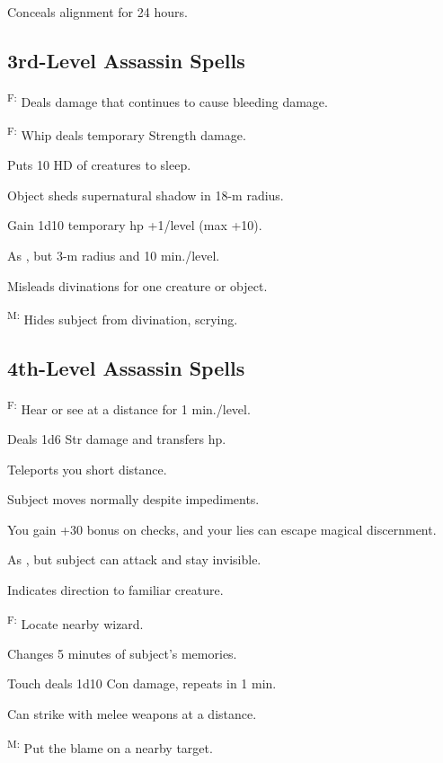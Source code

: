  Conceals alignment for 24 hours.




\subsection{3rd-Level Assassin Spells}

\textsuperscript{F:} Deals damage that continues to cause bleeding damage.%

\textsuperscript{F:} Whip deals temporary Strength damage. %

 Puts 10 HD of creatures to sleep.

 Object sheds supernatural shadow in 18-m radius.

 Gain 1d10 temporary hp +1/level (max +10).

 As , but 3-m radius and 10 min./level.

 Misleads divinations for one creature or object.

\textsuperscript{M:} Hides subject from divination, scrying.




\subsection{4th-Level Assassin Spells}

\textsuperscript{F:} Hear or see at a distance for 1 min./level.

 Deals 1d6 Str damage and transfers hp. %

 Teleports you short distance.

 Subject moves normally despite impediments.

 You gain +30 bonus on  checks, and your lies can escape magical discernment.

 As , but subject can attack and stay invisible.

 Indicates direction to familiar creature.

\textsuperscript{F:} Locate nearby wizard. %

 Changes 5 minutes of subject’s memories.

 Touch deals 1d10 Con damage, repeats in 1 min.

 Can strike with melee weapons at a distance. %

\textsuperscript{M:} Put the blame on a nearby target. %
